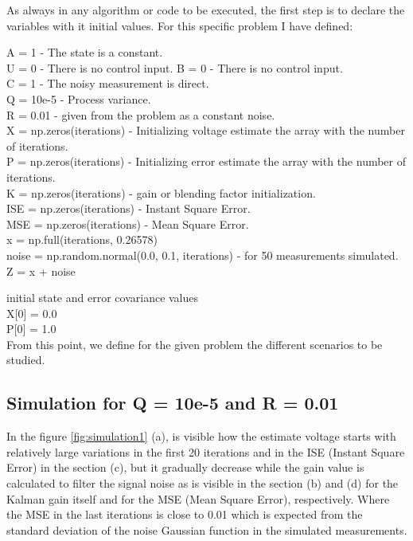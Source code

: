 \documentclass{article}
\begin{document}
    As always in any algorithm or code  to be executed, the first step is to declare the variables with it initial values.
    For this specific problem I have defined:

    A = 1 - The state is a constant. \\
    U = 0 - There is no control input.
    B = 0 - There is no control input. \\
    C = 1 - The noisy measurement is direct. \\
    Q = 10e-5 - Process variance. \\
    R = 0.01 - given from the problem as a constant noise. \\
    X = np.zeros(iterations)  - Initializing voltage estimate the array with the number of iterations.  \\
    P = np.zeros(iterations) - Initializing error estimate the array with the number of iterations. \\
    K = np.zeros(iterations) - gain or blending factor initialization.\\
    ISE = np.zeros(iterations) - Instant Square Error. \\
    MSE = np.zeros(iterations) - Mean Square Error. \\
    x = np.full(iterations, 0.26578) \\
    noise = np.random.normal(0.0, 0.1, iterations) - for 50 measurements simulated. \\
    Z = x + noise

    initial state and error covariance values \\
    X[0] = 0.0 \\
    P[0] = 1.0 \\

    From this point, we define for the given problem the different scenarios to be studied.
    
    \subsection{Simulation for Q = 10e-5 and R = 0.01}
    
    In the figure \ref{fig:simulation1} (a), is visible how the estimate voltage starts with relatively
    large variations in the first 20 iterations and in the ISE (Instant Square Error) in the section (c), 
    but it gradually decrease while the gain value is calculated to filter the signal noise as is visible
    in the section (b) and (d) for the Kalman gain itself and for the MSE (Mean Square Error), respectively.
    Where the MSE in the last iterations is close to 0.01 which is expected from the standard deviation of 
    the noise Gaussian function in the simulated measurements.
\end{document}
